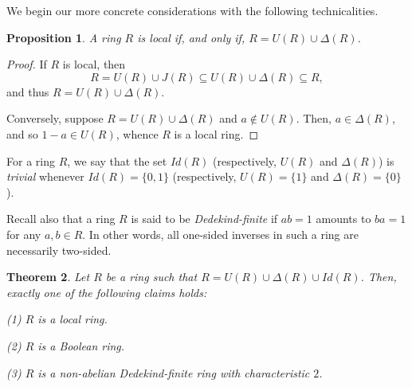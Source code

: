 \documentclass[12pt]{amsart}
\newtheorem{theorem}{Theorem}[section]
\newtheorem{proposition}[theorem]{Proposition}
\theoremstyle{definition}
\begin{document}
We begin our more concrete considerations with the following technicalities.

\begin{proposition}\label{local}
A ring $R$ is local if, and only if, \( R = U(R) \cup \Delta(R) \).
\end{proposition}

\begin{proof}
If \( R \) is local, then \[ R=U(R) \cup J(R) \subseteq U(R) \cup \Delta(R) \subseteq R ,\] and thus \( R=U(R) \cup \Delta(R) \).

Conversely, suppose \( R=U(R) \cup \Delta(R) \) and \( a \notin U(R) \). Then, \( a \in \Delta(R) \), and so \( 1-a \in U(R) \), whence \( R \) is a local ring.
\end{proof}

For a ring \( R \), we say that the set \( Id(R) \) (respectively, \( U(R) \) and \( \Delta(R) \)) is \textit{trivial} whenever \( Id(R) = \{0,1\} \) (respectively, \( U(R) = \{1\} \) and \( \Delta(R) = \{0\}\)).

\medskip

Recall also that a ring $R$ is said to be {\it Dedekind-finite} if $ab=1$ amounts to $ba=1$ for any $a,b\in R$. In other words, all one-sided inverses in such a ring are necessarily two-sided.

\begin{theorem}\label{lad}
Let \( R \) be a ring such that \( R = U(R) \cup \Delta(R) \cup Id(R) \). Then, exactly one of the following claims holds:

(1) \( R \) is a local ring.
	
(2) \( R \) is a Boolean ring.
	
(3) \( R \) is a non-abelian Dedekind-finite ring with characteristic \( 2 \).
\end{theorem}
\end{document}
